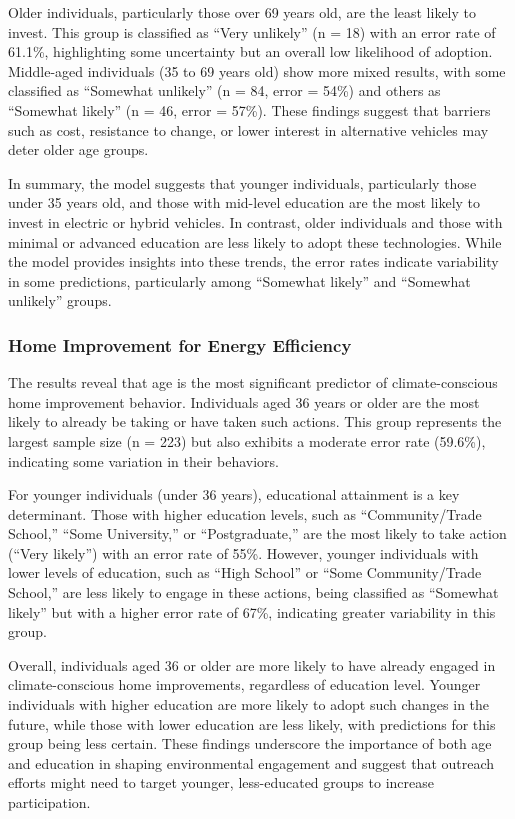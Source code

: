 \documentclass[
  letterpaper,
  DIV=11,
  numbers=noendperiod]{scrartcl}
\begin{document}
Older individuals, particularly those over 69 years old, are the least
likely to invest. This group is classified as ``Very unlikely'' (n = 18)
with an error rate of 61.1\%, highlighting some uncertainty but an
overall low likelihood of adoption. Middle-aged individuals (35 to 69
years old) show more mixed results, with some classified as ``Somewhat
unlikely'' (n = 84, error = 54\%) and others as ``Somewhat likely'' (n =
46, error = 57\%). These findings suggest that barriers such as cost,
resistance to change, or lower interest in alternative vehicles may
deter older age groups.

In summary, the model suggests that younger individuals, particularly
those under 35 years old, and those with mid-level education are the
most likely to invest in electric or hybrid vehicles. In contrast, older
individuals and those with minimal or advanced education are less likely
to adopt these technologies. While the model provides insights into
these trends, the error rates indicate variability in some predictions,
particularly among ``Somewhat likely'' and ``Somewhat unlikely'' groups.

\subsubsection{Home Improvement for Energy
Efficiency}\label{home-improvement-for-energy-efficiency}

The results reveal that age is the most significant predictor of
climate-conscious home improvement behavior. Individuals aged 36 years
or older are the most likely to already be taking or have taken such
actions. This group represents the largest sample size (n = 223) but
also exhibits a moderate error rate (59.6\%), indicating some variation
in their behaviors.

For younger individuals (under 36 years), educational attainment is a
key determinant. Those with higher education levels, such as
``Community/Trade School,'' ``Some University,'' or ``Postgraduate,''
are the most likely to take action (``Very likely'') with an error rate
of 55\%. However, younger individuals with lower levels of education,
such as ``High School'' or ``Some Community/Trade School,'' are less
likely to engage in these actions, being classified as ``Somewhat
likely'' but with a higher error rate of 67\%, indicating greater
variability in this group.

Overall, individuals aged 36 or older are more likely to have already
engaged in climate-conscious home improvements, regardless of education
level. Younger individuals with higher education are more likely to
adopt such changes in the future, while those with lower education are
less likely, with predictions for this group being less certain. These
findings underscore the importance of both age and education in shaping
environmental engagement and suggest that outreach efforts might need to
target younger, less-educated groups to increase participation.
\end{document}
